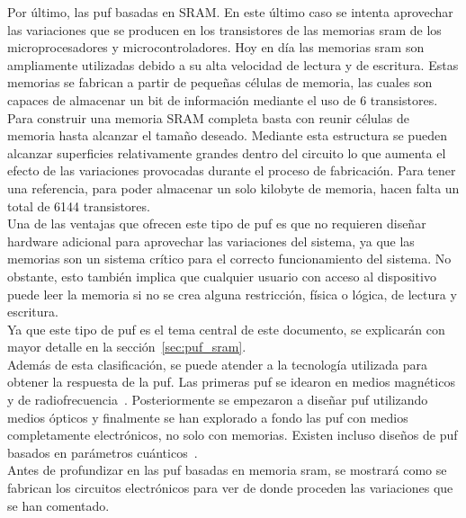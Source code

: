 \documentclass[spanish]{template/minim}
\begin{document}

Por último, las \gls{puf} basadas en SRAM. En este último caso se intenta aprovechar las variaciones que se producen en los transistores de las memorias \gls{sram} de los microprocesadores y microcontroladores. Hoy en día las memorias \gls{sram} son ampliamente utilizadas debido a su alta velocidad de lectura y de escritura. Estas memorias se fabrican a partir de pequeñas células de memoria, las cuales son capaces de almacenar un bit de información mediante el uso de 6 transistores.\\

Para construir una memoria SRAM completa basta con reunir células de memoria hasta alcanzar el tamaño deseado. Mediante esta estructura se pueden alcanzar superficies relativamente grandes dentro del circuito lo que aumenta el efecto de las variaciones provocadas durante el proceso de fabricación. Para tener una referencia, para poder almacenar un solo kilobyte de memoria, hacen falta un total de 6144 transistores.\\

Una de las ventajas que ofrecen este tipo de \gls{puf} es que no requieren diseñar hardware adicional para aprovechar las variaciones del sistema, ya que las memorias son un sistema crítico para el correcto funcionamiento del sistema. No obstante, esto también implica que cualquier usuario con acceso al dispositivo puede leer la memoria si no se crea alguna restricción, física o lógica, de lectura y escritura.\\

Ya que este tipo de \gls{puf} es el tema central de este documento, se explicarán con mayor detalle en la sección~\ref{sec:puf_sram}.\\

Además de esta clasificación, se puede atender a la tecnología utilizada para obtener la respuesta de la \gls{puf}. Las primeras \gls{puf} se idearon en medios magnéticos y de radiofrecuencia~\cite{one_way_functions}. Posteriormente se empezaron a diseñar \gls{puf} utilizando medios ópticos y finalmente se han explorado a fondo las \gls{puf} con medios completamente electrónicos, no solo con memorias. Existen incluso diseños de \gls{puf} basados en parámetros cuánticos~\cite{quantum_puf}.\\

Antes de profundizar en las \gls{puf} basadas en memoria \gls{sram}, se mostrará como se fabrican los circuitos electrónicos para ver de donde proceden las variaciones que se han comentado.\\
\end{document}
